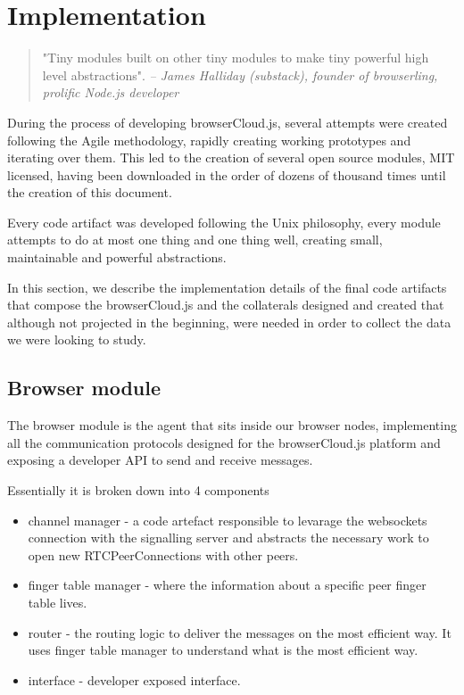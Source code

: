 \chapter{Implementation}\label{ch:implemenation}

\begin{quotation}
"Tiny modules built on other tiny modules to make tiny powerful high level abstractions".
{\small\it -- James Halliday (substack), founder of browserling, prolific Node.js developer}
\end{quotation}

During the process of developing browserCloud.js, several attempts were created following the Agile methodology, rapidly creating working prototypes and iterating over them. This led to the creation of several open source modules, MIT licensed, having been downloaded in the order of dozens of thousand times until the creation of this document.

Every code artifact was developed following the Unix philosophy, every module attempts to do at most one thing and one thing well, creating small, maintainable and powerful abstractions.

In this section, we describe the implementation details of the final code artifacts that compose the browserCloud.js and the collaterals designed and created that although not projected in the beginning, were needed in order to collect the data we were looking to study.

\section{Browser module}

The browser module is the agent that sits inside our browser nodes, implementing all the communication protocols designed for the browserCloud.js platform and exposing a developer API to send and receive messages.

Essentially it is broken down into 4 components

\begin{itemize}
    \item channel manager - a code artefact responsible to levarage the websockets connection with the signalling server and abstracts the necessary work to open new RTCPeerConnections with other peers.
    \item finger table manager - where the information about a specific peer finger table lives.
    \item router - the routing logic to deliver the messages on the most efficient way. It uses finger table manager to understand what is the most efficient way.
    \item interface - developer exposed interface.
\end{itemize}

